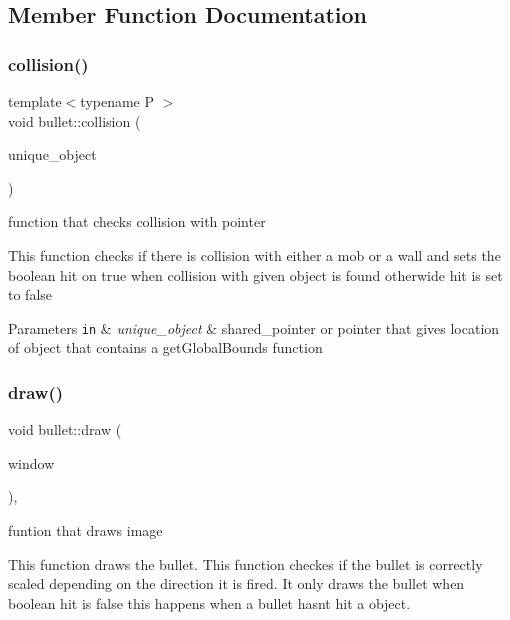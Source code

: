 \subsection{Member Function Documentation}
\mbox{\label{classbullet_ab7e5c677bbd642df24a2251bb58249b7}} 
\subsubsection{\texorpdfstring{collision()}{collision()}}
{\footnotesize\ttfamily template$<$typename P $>$ \\
void bullet\+::collision (\begin{DoxyParamCaption}\item[{P}]{unique\+\_\+object }\end{DoxyParamCaption})}



function that checks collision with pointer 

This function checks if there is collision with either a mob or a wall and sets the boolean hit on true when collision with given object is found otherwide hit is set to false


\begin{DoxyParams}[1]{Parameters}
\mbox{\tt in}  & {\em unique\+\_\+object} & shared\+\_\+pointer or pointer that gives location of object that contains a get\+Global\+Bounds function \\
\hline
\end{DoxyParams}
\mbox{\label{classbullet_ae999b952538687d45ca2ae54164a5cd8}} 
\subsubsection{\texorpdfstring{draw()}{draw()}}
{\footnotesize\ttfamily void bullet\+::draw (\begin{DoxyParamCaption}\item[{sf\+::\+Render\+Window \&}]{window }\end{DoxyParamCaption})\hspace{0.3cm}{\ttfamily [override]}, {\ttfamily [virtual]}}



funtion that draws image 

This function draws the bullet. This function checkes if the bullet is correctly scaled depending on the direction it is fired. It only draws the bullet when boolean hit is false this happens when a bullet hasn\textquotesingle{}t hit a object.


